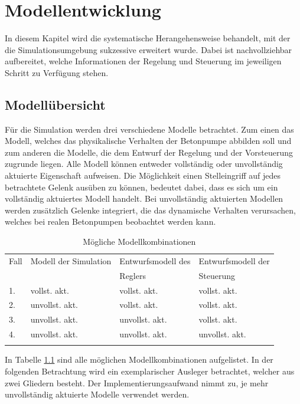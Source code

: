 \chapter{Modellentwicklung}\label{ch:modellentwicklung}

In diesem Kapitel wird die systematische Herangehensweise behandelt, mit der die Simulationsumgebung sukzessive erweitert wurde. Dabei ist nachvollziehbar aufbereitet, welche Informationen der Regelung und Steuerung im jeweiligen Schritt zu Verfügung stehen.

\section{Modellübersicht}

Für die Simulation werden drei verschiedene Modelle betrachtet. Zum einen das Modell, welches das physikalische Verhalten der Betonpumpe abbilden soll und zum anderen die Modelle, die dem Entwurf der Regelung und der Vorsteuerung zugrunde liegen. Alle Modell können entweder vollständig oder unvollständig aktuierte Eigenschaft aufweisen. Die Möglichkeit einen Stelleingriff auf jedes betrachtete Gelenk ausüben zu können, bedeutet dabei, dass es sich um ein vollständig aktuiertes Modell handelt. Bei unvollständig aktuierten Modellen werden zusätzlich Gelenke integriert, die das dynamische Verhalten verursachen, welches bei realen Betonpumpen beobachtet werden kann.\\

\begin{table}[htbp]
	\centering
	\caption{Mögliche Modellkombinationen}
	\label{tab:Modellübersicht}
	\begin{tabular}{llll}
		Fall & Modell der Simulation & Entwurfsmodell des  & Entwurfsmodell der\\
		&						& Reglers			& Steuerung\\
		\toprule
		1.& vollst. akt. & vollst. akt. & vollst. akt.\\
		2.& unvollst. akt. & vollst. akt. & vollst. akt.\\
		3.& unvollst. akt. & unvollst. akt. & vollst. akt.\\
		4.& unvollst. akt. & unvollst. akt. & unvollst. akt.\\
		\bottomrule\\
	\end{tabular}
\end{table}

In Tabelle \ref{tab:Modellübersicht} sind alle möglichen Modellkombinationen aufgelistet. In der folgenden Betrachtung wird ein exemplarischer Ausleger betrachtet, welcher aus zwei Gliedern besteht. Der Implementierungsaufwand nimmt zu, je mehr unvollständig aktuierte Modelle verwendet werden.


